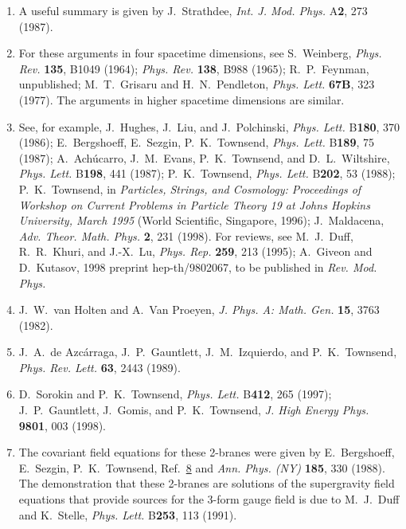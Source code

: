 \begin{enumerate}
  \item[6b.] \label{ch32-ref-6b}
  A useful summary is given by J.~Strathdee, \textit{Int. J. Mod.
  Phys.} A\textbf{2}, 273 (1987).

  \item {}\label{ch32-ref-7}
  For these arguments in four spacetime dimensions, see S.~Weinberg,
  \textit{Phys. Rev.} \textbf{135}, B1049 (1964);
  \textit{Phys. Rev.} \textbf{138}, B988 (1965); R.~P.~Feynman,
  unpublished; M.~T.~Grisaru and H.~N.~Pendleton,
  \textit{Phys. Lett.} \textbf{67B}, 323 (1977). The arguments in
  higher spacetime dimensions are similar.

  \item {}\label{ch32-ref-8}
  See, for example, J.~Hughes, J.~Liu, and J.~Polchinski,
  \textit{Phys. Lett.} B\textbf{180}, 370 (1986); E.~Bergshoeff,
  E.~Sezgin, P.~K.~Townsend, \textit{Phys. Lett.} B\textbf{189}, 75
  (1987); A.~Ach\'ucarro, J.~M.~Evans, P.~K.~Townsend, and
  D.~L.~Wiltshire, \textit{Phys. Lett.} B\textbf{198}, 441 (1987);
  P.~K.~Townsend, \textit{Phys. Lett.} B\textbf{202}, 53 (1988);
  P.~K.~Townsend, in \textit{Particles, Strings, and Cosmology:
  Proceedings of Workshop on Current Problems in Particle Theory 19
  at Johns Hopkins University, March 1995} (World Scientific,
  Singapore, 1996); J.~Maldacena, \textit{Adv. Theor. Math. Phys.}
  \textbf{2}, 231 (1998). For reviews, see M.~J.~Duff, R.~R.~Khuri,
  and J.-X.~Lu, \textit{Phys. Rep.} \textbf{259}, 213 (1995);
  A.~Giveon and D.~Kutasov, 1998 preprint hep-th/9802067, to be
  published in \textit{Rev. Mod. Phys.}

  \item {}\label{ch32-ref-9}
  J.~W.~van Holten and A.~Van Proeyen, \textit{J. Phys. A: Math. Gen.}
  \textbf{15}, 3763 (1982).

  \item {}\label{ch32-ref-10}
  J.~A.~de Azc\'arraga, J.~P.~Gauntlett, J.~M.~Izquierdo, and
  P.~K.~Townsend, \textit{Phys. Rev. Lett.} \textbf{63}, 2443 (1989).

  \item {}\label{ch32-ref-11}
  D.~Sorokin and P.~K.~Townsend, \textit{Phys. Lett.} B\textbf{412},
  265 (1997); J.~P.~Gauntlett, J.~Gomis, and P.~K.~Townsend,
  \textit{J. High Energy Phys.} \textbf{9801}, 003 (1998).

  \item {}\label{ch32-ref-12}
  The covariant field equations for these 2-branes were given by
  E.~Bergshoeff, E.~Sezgin, P.~K.~Townsend,
  Ref.~\hyperref[ch32-ref-8]{8} and \textit{Ann. Phys. (NY)}
  \textbf{185}, 330 (1988). The demonstration that these 2-branes are
  solutions of the supergravity field equations that provide sources
  for the 3-form gauge field is due to M.~J.~Duff and K.~Stelle,
  \textit{Phys. Lett.} B\textbf{253}, 113 (1991).


\end{enumerate}

